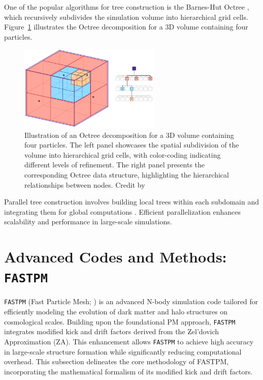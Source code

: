 One of the popular algorithms for tree construction is the Barnes-Hut Octree \citep{1986Natur.324..446B}, which recursively subdivides the simulation volume into hierarchical grid cells. Figure~\ref{fig:barnes-hut} illustrates the Octree decomposition for a 3D volume containing four particles.
\begin{figure}[ht]
    \centering
    \includegraphics[width=0.6\textwidth]{figures/Octree.png}
    \caption[Illustration of an Octree decomposition]{Illustration of an Octree decomposition for a 3D volume containing four particles. The left panel showcases the spatial subdivision of the volume into hierarchical grid cells, with color-coding indicating different levels of refinement. The right panel presents the corresponding Octree data structure, highlighting the hierarchical relationships between nodes. Credit by \citet{Powell2023}}
    \label{fig:barnes-hut}
\end{figure}

Parallel tree construction involves building local trees within each subdomain and integrating them for global computations \citep{DUBINSKI1996133}. Efficient parallelization enhances scalability and performance in large-scale simulations.

\section{Advanced Codes and Methods: \texttt{FASTPM}} \label{sec:fastpm}
\texttt{FASTPM} (Fast Particle Mesh; \citealt{10.1093/mnras/stw2123}) is an advanced N-body simulation code tailored for efficiently modeling the evolution of dark matter and halo structures on cosmological scales. Building upon the foundational PM approach, \texttt{FASTPM} integrates modified kick and drift factors derived from the Zel'dovich Approximation (ZA). This enhancement allows \texttt{FASTPM} to achieve high accuracy in large-scale structure formation while significantly reducing computational overhead. This subsection delineates the core methodology of FASTPM, incorporating the mathematical formalism of its modified kick and drift factors.

